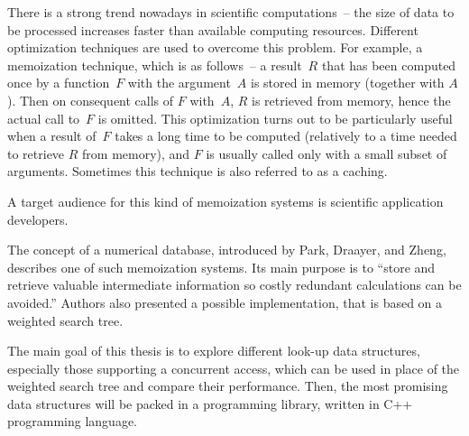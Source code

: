 
There is a strong trend nowadays in scientific computations~-- the size of data to be processed increases faster than available computing resources. Different optimization techniques are used to overcome this problem. For example, a memoization technique, which is as follows~-- a result~$R$ that has been computed once by a function~$F$ with the argument~$A$ is stored in memory (together with $A$). Then on consequent calls of $F$ with~$A$, $R$ is retrieved from memory, hence the actual call to~$F$ is omitted. This optimization turns out to be particularly useful when a result of~$F$ takes a long time to be computed (relatively to a time needed to retrieve $R$ from memory), and $F$ is usually called only with a small subset of arguments. Sometimes this technique is also referred to as a caching.

A target audience for this kind of memoization systems is scientific application developers.

The concept of a numerical database, introduced by Park, Draayer, and Zheng\cite{park90}, describes one of such memoization systems. Its main purpose is to ``store and retrieve valuable intermediate information so costly redundant calculations can be avoided.'' Authors also presented a possible implementation, that is based on a weighted search tree.

The main goal of this thesis is to explore different look-up data structures, especially those supporting a concurrent access, which can be used in place of the weighted search tree and compare their performance. Then, the most promising data structures will be packed in a programming library, written in C++ programming language.

